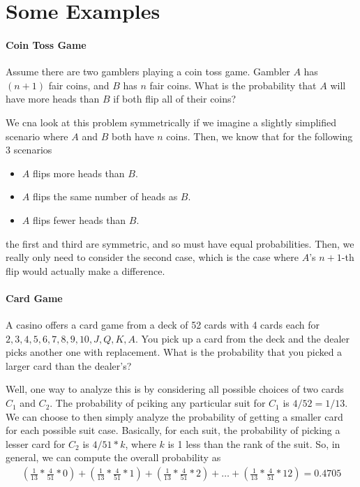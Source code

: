 \documentclass[10pt,a4paper]{article}
\begin{document}
\section*{Some Examples}

\paragraph{Coin Toss Game} Assume there are two gamblers playing a coin toss game. Gambler $A$ has $(n+1)$ fair coins, and $B$ has $n$ fair coins. What is the probability that $A$ will have more heads than $B$ if both flip all of their coins?

We cna look at this problem symmetrically if we imagine a slightly simplified scenario where $A$ and $B$ both have $n$ coins. Then, we know that for the following 3 scenarios
\begin{itemize}
    \item $A$ flips more heads than $B$.
    \item $A$ flips the same number of heads as $B$.
    \item $A$ flips fewer heads than $B$. 
\end{itemize}
the first and third are symmetric, and so must have equal probabilities. Then, we really only need to consider the second case, which is the case where $A$'s $n+1$-th flip would actually make a difference.

\paragraph*{Card Game} A casino offers a card game from a deck of 52 cards with 4 cards each for $2,3,4,5,6,7,8,9,10,J,Q,K,A$. You pick up a card from the deck and the dealer picks another one with replacement. What is the probability that you picked a larger card than the dealer's?

Well, one way to analyze this is by considering all possible choices of two cards $C_1$ and $C_2$. The probability of pciking any particular suit for $C_1$ is $4/52 = 1/13$. We can choose to then simply analyze the probability of getting a smaller card for each possible suit case. Basically, for each suit, the probability of picking a lesser card for $C_2$ is $4/51 * k$, where $k$ is 1 less than the rank of the suit. So, in general, we can compute the overall probability as
\begin{align*}
    \left(\frac{1}{13}*\frac{4}{51}*0\right) + \left(\frac{1}{13}*\frac{4}{51}*1\right) + \left(\frac{1}{13}*\frac{4}{51}*2\right) + \dots + \left(\frac{1}{13}*\frac{4}{51}*12\right) = 0.4705
\end{align*}
\end{document}
